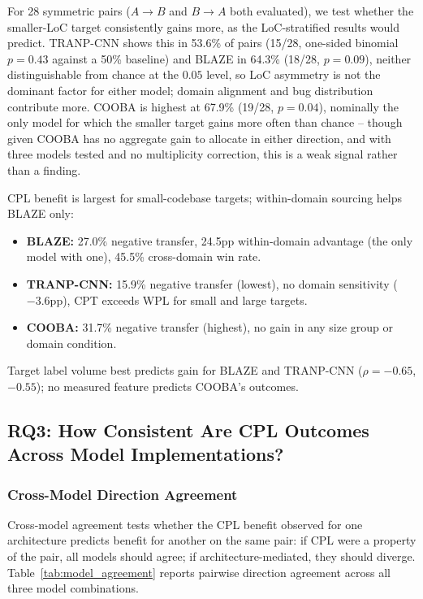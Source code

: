 \documentclass[a4paper,fleqn]{cas-dc}
\begin{document}
For 28 symmetric pairs ($A \to B$ and $B \to A$ both evaluated), we test
whether the smaller-LoC target consistently gains more, as the LoC-stratified
results would predict. TRANP-CNN shows this in 53.6\% of pairs
(15/28, one-sided binomial $p = 0.43$ against a 50\% baseline) and BLAZE in
64.3\% (18/28, $p = 0.09$), neither distinguishable from chance at the $0.05$
level, so LoC asymmetry is not the dominant factor for either
model; domain alignment and bug distribution contribute more.
COOBA is highest at 67.9\% (19/28, $p = 0.04$), nominally the only model for which
the smaller target gains more often than chance -- though given COOBA has no
aggregate gain to allocate in either direction, and with three models tested
and no multiplicity correction, this is a weak signal rather than a finding.

\begin{tcolorbox}[colback=gray!10, colframe=gray!50, title=\textbf{RQ2 Summary}]
CPL benefit is largest for small-codebase targets; within-domain sourcing
helps BLAZE only:
\begin{itemize}[noitemsep,topsep=2pt]
  \item \textbf{BLAZE:} 27.0\% negative transfer, 24.5pp
        within-domain advantage (the only model with one), 45.5\% cross-domain win rate.
  \item \textbf{TRANP-CNN:} 15.9\% negative transfer (lowest), no domain
        sensitivity ($-3.6$pp), CPT
        exceeds WPL for small and large targets.
  \item \textbf{COOBA:} 31.7\% negative transfer (highest), no gain in any
        size group or domain condition.
\end{itemize}
Target label volume best predicts gain for BLAZE and TRANP-CNN
($\rho = -0.65$, $-0.55$); no measured feature predicts COOBA's outcomes.
\end{tcolorbox}

\subsection{RQ3: How Consistent Are CPL Outcomes Across Model Implementations?}

\subsubsection{Cross-Model Direction Agreement}

 Cross-model agreement tests whether the CPL benefit observed for one
architecture predicts benefit for another on the same pair: if CPL were a
property of the pair, all models should agree; if architecture-mediated,
they should diverge. Table~\ref{tab:model_agreement} reports pairwise
direction agreement across all three model combinations.
\end{document}
